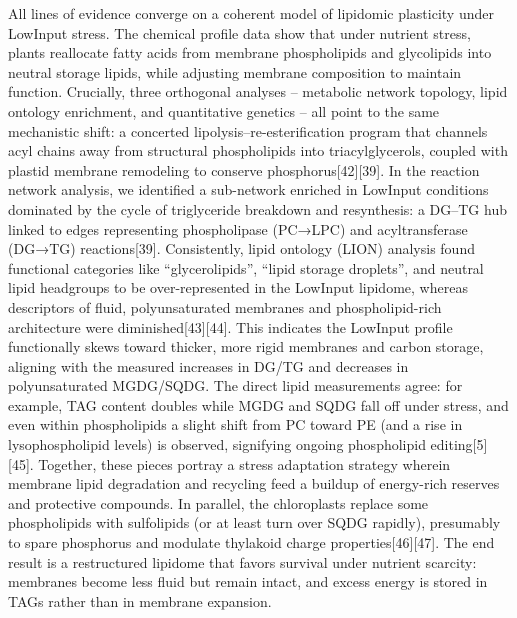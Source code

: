 \documentclass[10pt,letterpaper]{article}
\begin{document}
All lines of evidence converge on a coherent model of lipidomic plasticity under LowInput stress. The chemical profile data show that under nutrient stress, plants reallocate fatty acids from membrane phospholipids and glycolipids into neutral storage lipids, while adjusting membrane composition to maintain function. Crucially, three orthogonal analyses – metabolic network topology, lipid ontology enrichment, and quantitative genetics – all point to the same mechanistic shift: a concerted lipolysis–re-esterification program that channels acyl chains away from structural phospholipids into triacylglycerols, coupled with plastid membrane remodeling to conserve phosphorus[42][39]. In the reaction network analysis, we identified a sub-network enriched in LowInput conditions dominated by the cycle of triglyceride breakdown and resynthesis: a DG–TG hub linked to edges representing phospholipase (PC→LPC) and acyltransferase (DG→TG) reactions[39]. Consistently, lipid ontology (LION) analysis found functional categories like “glycerolipids”, “lipid storage droplets”, and neutral lipid headgroups to be over-represented in the LowInput lipidome, whereas descriptors of fluid, polyunsaturated membranes and phospholipid-rich architecture were diminished[43][44]. This indicates the LowInput profile functionally skews toward thicker, more rigid membranes and carbon storage, aligning with the measured increases in DG/TG and decreases in polyunsaturated MGDG/SQDG. The direct lipid measurements agree: for example, TAG content doubles while MGDG and SQDG fall off under stress, and even within phospholipids a slight shift from PC toward PE (and a rise in lysophospholipid levels) is observed, signifying ongoing phospholipid editing[5][45]. Together, these pieces portray a stress adaptation strategy wherein membrane lipid degradation and recycling feed a buildup of energy-rich reserves and protective compounds. In parallel, the chloroplasts replace some phospholipids with sulfolipids (or at least turn over SQDG rapidly), presumably to spare phosphorus and modulate thylakoid charge properties[46][47]. The end result is a restructured lipidome that favors survival under nutrient scarcity: membranes become less fluid but remain intact, and excess energy is stored in TAGs rather than in membrane expansion.
\end{document}
